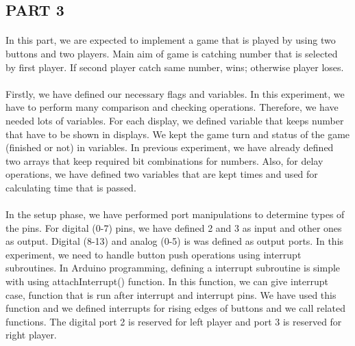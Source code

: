 \documentclass[pdftex,12pt,a4paper]{article}
\begin{document}
\begin{flushleft}
\subsection{PART 3}
\paragraph{}
In this part, we are expected to implement a game that is played by using two buttons and two players. Main aim of game is catching number that is selected by first player. If second player catch same number, wins; otherwise player loses.
\paragraph{}
Firstly, we have defined our necessary flags and variables. In this experiment, we have to perform many comparison and checking operations. Therefore, we have needed lots of variables. For each display, we defined variable that keeps number that have to be shown in displays. We kept the game turn and status of the game (finished or not) in variables. In previous experiment, we have already defined two arrays that keep required bit combinations for numbers. Also, for delay operations, we have defined two variables that are kept times and used for calculating time that is passed.
\paragraph{}
In the setup phase, we have performed port manipulations to determine types of the pins. For digital (0-7) pins, we have defined 2 and 3 as input and other ones as output. Digital (8-13) and analog (0-5) is was defined as output ports. In this experiment, we need to handle button push operations using interrupt subroutines. In Arduino programming, defining a interrupt subroutine is simple with using attachInterrupt() function. In this function, we can give interrupt case, function that is run after interrupt and interrupt pins. We have used this function and we defined interrupts for rising edges of buttons and we call related functions. The digital port 2 is reserved for left player and port 3 is reserved for right player.

\end{flushleft}
\end{document}
